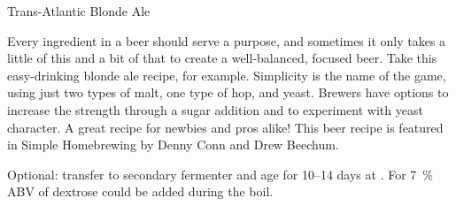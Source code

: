 \begin{recipie}{Trans-Atlantic Blonde Ale}

\begin{aboutblock}
Every ingredient in a beer should serve a purpose, and sometimes it only takes a
little of this and a bit of that to create a well-balanced, focused beer. Take
this easy-drinking blonde ale recipe, for example. Simplicity is the name of the
game, using just two types of malt, one type of hop, and yeast. Brewers have
options to increase the strength through a sugar addition and to experiment with
yeast character. A great recipe for newbies and pros alike! This beer recipe is
featured in Simple Homebrewing by Denny Conn and Drew Beechum. \sourceaha
\end{aboutblock}


\begin{methodandtiming}
 
\begin{mashsteps}
\end{mashsteps}

\begin{fermentationsteps}
\end{fermentationsteps}

\begin{directions}
Optional: transfer to secondary fermenter and age for 10--14 days at
. For 7~\% ABV  of dextrose could be added during
the boil.
\end{directions}

\end{methodandtiming}

\pagebreak

\begin{ingredientsblock}

\begin{malts}
\end{malts}

\begin{hops}
\end{hops}


\end{ingredientsblock}

\end{recipie}
